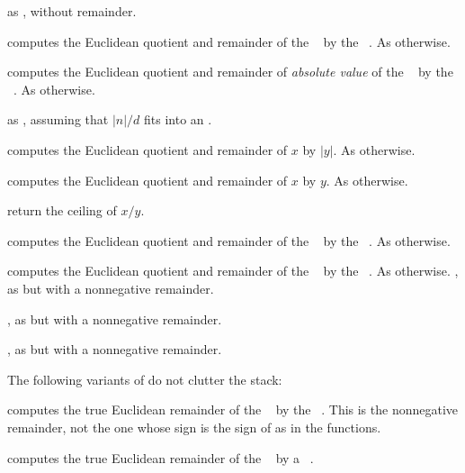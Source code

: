  as , without
remainder.

 computes the Euclidean quotient
and remainder of the ~ by the ~. As
 otherwise.

 computes the Euclidean quotient
and remainder of \emph{absolute value} of the ~ by the
~. As  otherwise.

 as , assuming
that $|n|/d$ fits into an .

computes the Euclidean quotient and remainder of $x$ by $|y|$. As
 otherwise.

computes the Euclidean quotient and remainder of $x$ by $y$. As
 otherwise.

 return the ceiling of $x / y$.

 computes the Euclidean quotient
and remainder of the ~ by the ~. As
 otherwise.

 computes the Euclidean quotient
and remainder of the ~ by the ~. As
 otherwise.
\smallskip
{}, as  but with a
nonnegative remainder.

, as  but with a
nonnegative remainder.

, as  but with a
nonnegative remainder.

 The following variants of  do not
clutter the stack:

 computes the true Euclidean
remainder of the ~ by the ~. This is the
nonnegative remainder, not the one whose sign is the sign of 
as in the  functions.

 computes the true Euclidean
remainder of the ~ by a ~.

